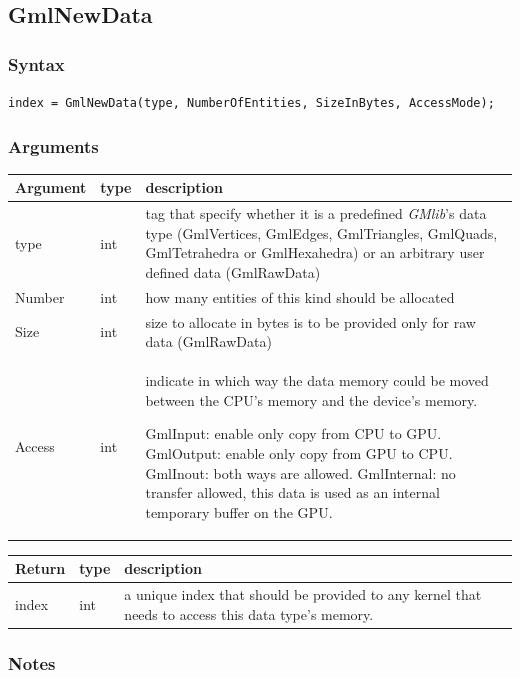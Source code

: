 \documentclass[a4paper,12pt]{article}
\begin{document}
\subsection{GmlNewData}
\subsubsection*{Syntax}

{\tt index = GmlNewData(type, NumberOfEntities, SizeInBytes, AccessMode);}
\subsubsection*{Arguments}

\begin{tabular}{|m{2cm}|m{1.5cm}|m{10.5cm}|}
\hline
Argument   & type   & description \\
\hline
type       & int    & tag that specify whether it is a predefined \emph{GMlib}'s data type (GmlVertices, GmlEdges, GmlTriangles, GmlQuads, GmlTetrahedra or GmlHexahedra) or an arbitrary user defined data (GmlRawData) \\
\hline
Number     & int    & how many entities of this kind should be allocated \\
\hline
Size       & int    & size to allocate in bytes is to be provided only for raw data (GmlRawData) \\
\hline
Access     & int    & indicate in which way the data memory could be moved between the CPU's memory and the device's memory.

GmlInput: enable only copy from CPU to GPU.
GmlOutput: enable only copy from GPU to CPU.
GmlInout: both ways are allowed.
GmlInternal: no transfer allowed, this data is used as an internal temporary buffer on the GPU.\\
\hline
\end{tabular}

\medskip

\begin{tabular}{|m{2cm}|m{1.5cm}|m{10.5cm}|}
\hline
Return  & type & description \\
\hline
index   & int  & a unique index that should be provided to any kernel that needs to access this data type's memory.\\
\hline
\end{tabular}

\subsubsection*{Notes}
\end{document}

